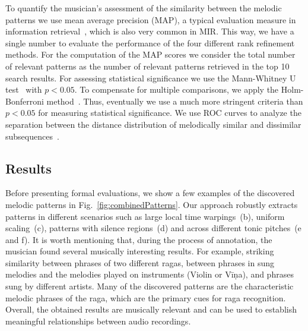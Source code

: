 To quantify the musician's assessment of the similarity between the melodic patterns  we use mean average precision (MAP), a typical evaluation measure in information retrieval~\cite{manning2008introduction}, which is also very common in MIR. This way, we have a single number to evaluate the performance of the four different rank refinement methods. For the computation of the MAP scores we consider the total number of relevant patterns as the number of relevant patterns retrieved in the top 10 search results.  For assessing statistical significance we use the Mann-Whitney U test~\cite{mann1947test} with $p < 0.05$. To compensate for multiple comparisons, we apply the Holm-Bonferroni method~\cite{holm1979simple}. Thus, eventually we use a much more stringent criteria than $p < 0.05$ for measuring statistical significance. We use ROC curves to analyze the separation between the distance distribution of melodically similar and dissimilar subsequences~\cite{manning2008introduction}. 

\subsection{Results}



Before presenting formal evaluations, we show a few examples of the discovered melodic patterns in Fig.~\ref{fig:combinedPatterns}. Our approach robustly extracts patterns in different scenarios such as large local time warpings~(b), uniform scaling~(c), patterns with silence regions~(d) and across different tonic pitches~(e and f). It is worth mentioning that, during the process of annotation, the musician found several musically interesting results. For example, striking similarity between phrases of two different \glspl{raga}, between phrases in sung melodies and the melodies played on instruments (Violin or V\={i}\d{n}a), and phrases sung by different artists. Many of the discovered patterns are the characteristic melodic phrases of the \gls{raga}, which are the primary cues for \gls{raga} recognition. Overall, the  obtained results are musically relevant and can be used to establish meaningful relationships between audio recordings.

